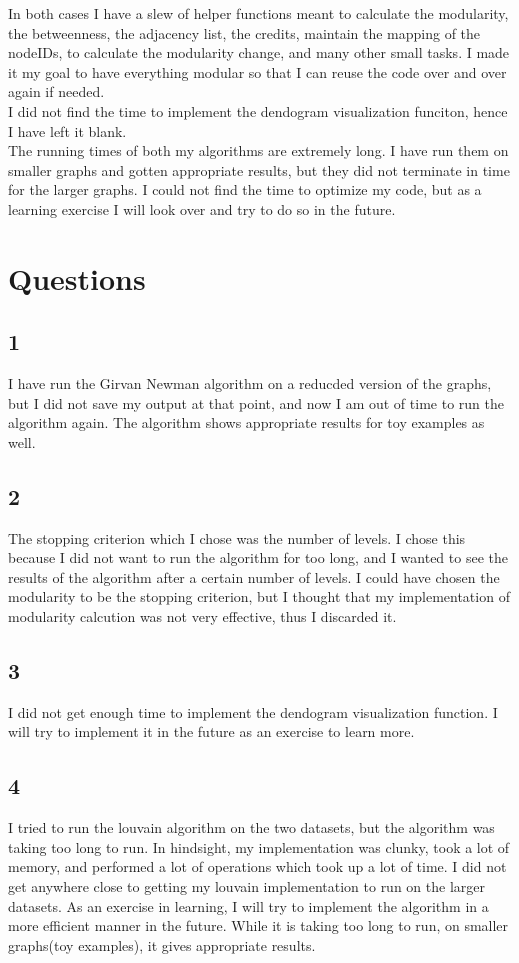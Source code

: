 \documentclass[12pt]{article}
\begin{document}
In both cases I have a slew of helper functions meant to calculate the modularity, the betweenness, the adjacency list, the credits, maintain the mapping of the nodeIDs, to calculate the modularity change, and many other small tasks. I made it my goal to have everything modular so that I can reuse the code over and over again if needed.\\
I did not find the time to implement the dendogram visualization funciton, hence I have left it blank.\\
The running times of both my algorithms are extremely long. I have run them on smaller graphs and gotten appropriate results, but they did not terminate in time for the larger graphs. I could not find the time to optimize my code, but as a learning exercise I will look over and try to do so in the future.

\section{Questions}
\subsection*{1}
I have run the Girvan Newman algorithm on a reducded version of the graphs, but I did not save my output at that point, and now I am out of time to run the algorithm again. The algorithm shows appropriate results for toy examples as well.

\subsection*{2}
The stopping criterion which I chose was the number of levels. I chose this because I did not want to run the algorithm for too long, and I wanted to see the results of the algorithm after a certain number of levels. I could have chosen the modularity to be the stopping criterion, but I thought that my implementation of modularity calcution was not very effective, thus I discarded it.

\subsection*{3}
I did not get enough time to implement the dendogram visualization function. I will try to implement it in the future as an exercise to learn more.

\subsection*{4}
I tried to run the louvain algorithm on the two datasets, but the algorithm was taking too long to run. In hindsight, my implementation was clunky, took a lot of memory, and performed a lot of operations which took up a lot of time. I did not get anywhere close to getting my louvain implementation to run on the larger datasets. As an exercise in learning, I will try to implement the algorithm in a more efficient manner in the future. While it is taking too long to run, on smaller graphs(toy examples), it gives appropriate results.
\end{document}
